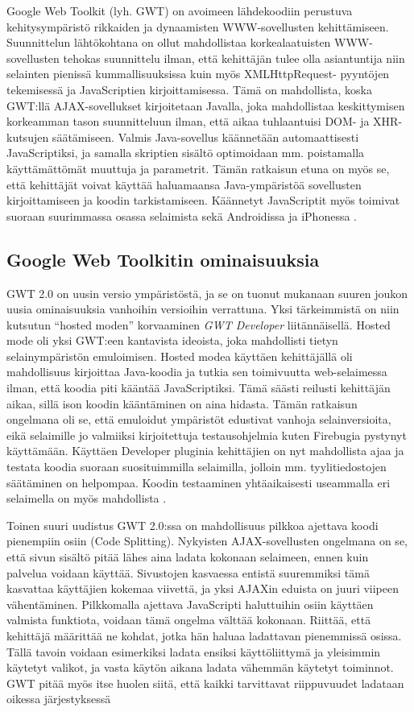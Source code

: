 Google Web Toolkit (lyh. GWT) on avoimeen lähdekoodiin perustuva kehitysympäristö rikkaiden ja dynaamisten WWW-sovellusten kehittämiseen. Suunnittelun lähtökohtana on ollut mahdollistaa
korkealaatuisten WWW-sovellusten tehokas suunnittelu ilman, että kehittäjän tulee olla asiantuntija niin selainten pienissä kummallisuuksissa kuin myös XMLHttpRequest- pyyntöjen
tekemisessä ja JavaScriptien kirjoittamisessa. Tämä on mahdollista, koska GWT:llä AJAX-sovellukset kirjoitetaan Javalla, joka mahdollistaa keskittymisen korkeamman tason suunnitteluun 
ilman, että aikaa tuhlaantuisi DOM- ja XHR-kutsujen säätämiseen. Valmis Java-sovellus käännetään automaattisesti JavaScriptiksi, ja samalla skriptien sisältö optimoidaan mm.
poistamalla käyttämättömät muuttuja ja parametrit. Tämän ratkaisun etuna on myös se, että kehittäjät voivat käyttää haluamaansa Java-ympäristöä sovellusten kirjoittamiseen ja koodin 
tarkistamiseen. Käännetyt JavaScriptit myös toimivat suoraan suurimmassa osassa selaimista sekä Androidissa ja iPhonessa \cite{GWT}.

\subsection{Google Web Toolkitin ominaisuuksia}

GWT 2.0 on uusin versio ympäristöstä, ja se on tuonut mukanaan suuren joukon uusia ominaisuuksia vanhoihin versioihin verrattuna. Yksi tärkeimmistä on niin kutsutun ``hosted moden'' 
korvaaminen \emph{GWT Developer} liitännäisellä. Hosted mode oli yksi GWT:een kantavista ideoista, joka mahdollisti tietyn selainympäristön emuloimisen. Hosted modea käyttäen 
kehittäjällä oli mahdollisuus kirjoittaa Java-koodia ja tutkia sen toimivuutta web-selaimessa ilman, että koodia piti kääntää JavaScriptiksi. Tämä säästi reilusti kehittäjän aikaa, sillä 
ison koodin kääntäminen on aina hidasta. Tämän ratkaisun ongelmana oli se, että emuloidut ympäristöt edustivat vanhoja selainversioita, eikä selaimille jo valmiiksi kirjoitettuja 
testausohjelmia kuten Firebugia pystynyt käyttämään. Käyttäen Developer pluginia kehittäjien on nyt mahdollista ajaa ja testata koodia suoraan suosituimmilla selaimilla, jolloin mm.
tyylitiedostojen säätäminen on helpompaa. Koodin testaaminen yhtäaikaisesti useammalla eri selaimella on myös mahdollista \cite{GWTnew}. 

Toinen suuri uudistus GWT 2.0:ssa on mahdollisuus pilkkoa ajettava koodi pienempiin osiin (Code Splitting). Nykyisten AJAX-sovellusten ongelmana on se, että sivun sisältö pitää lähes aina 
ladata kokonaan selaimeen, ennen kuin palvelua voidaan käyttää. Sivustojen kasvaessa entistä suuremmiksi tämä kasvattaa käyttäjien kokemaa viivettä, ja yksi AJAXin eduista on juuri
viipeen vähentäminen. Pilkkomalla ajettava JavaScripti haluttuihin osiin käyttäen valmista funktiota, voidaan tämä ongelma välttää kokonaan. Riittää, että kehittäjä määrittää ne kohdat, 
jotka hän haluaa ladattavan pienemmissä osissa. Tällä tavoin voidaan esimerkiksi ladata ensiksi käyttöliittymä ja yleisimmin käytetyt valikot, ja vasta käytön aikana ladata vähemmän 
käytetyt toiminnot. GWT pitää myös itse huolen siitä, että kaikki tarvittavat riippuvuudet ladataan oikessa järjestyksessä \cite{GWTnew}

